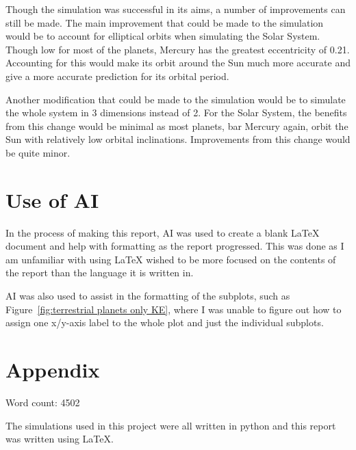 \documentclass[11pt, a4paper, onecolumn]{article}
\begin{document}
Though the simulation was successful in its aims, a number of improvements can still be made.
The main improvement that could be made to the simulation would be to account for elliptical orbits when simulating the Solar System. 
Though low for most of the planets, Mercury has the greatest eccentricity of 0.21. 
Accounting for this would make its orbit around the Sun much more accurate and give a more accurate prediction for its orbital period. 

Another modification that could be made to the simulation would be to simulate the whole system in 3 dimensions instead of 2. 
For the Solar System, the benefits from this change would be minimal as most planets, bar Mercury again, orbit the Sun with relatively low orbital inclinations. 
Improvements from this change would be quite minor.


\section{Use of AI} \label{Use of AI}
In the process of making this report, AI was used to create a blank LaTeX document and help with formatting as the report progressed. 
This was done as I am unfamiliar with using LaTeX wished to be more focused on the contents of the report than the language it is written in. 

AI was also used to assist in the formatting of the subplots, such as Figure~\ref{fig:terrestrial planets only KE}, where I was unable to figure out how 
to assign one x/y-axis label to the whole plot and just the individual subplots. 






\newpage
\section*{Appendix}
Word count: 4502

The simulations used in this project were all written in python and this report was written using LaTeX. 
\end{document}

